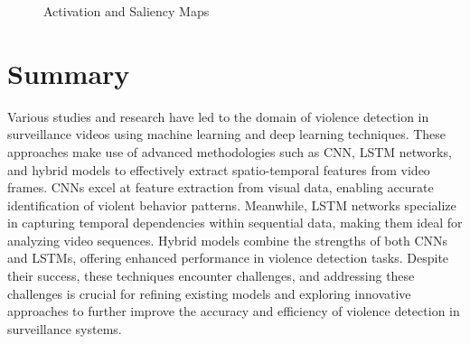\begin{figure}[h!]
\centering
{}
\hfill
{}
\caption{Activation and Saliency Maps}
    \label{LaM:2SRN}
\end{figure}


\section{Summary}

\noindent Various studies and research have led to the domain of violence detection in surveillance videos using machine learning and deep learning techniques. These approaches make use of advanced methodologies such as CNN, LSTM networks, and hybrid models to effectively extract spatio-temporal features from video frames. CNNs excel at feature extraction from visual data, enabling accurate identification of violent behavior patterns. Meanwhile, LSTM networks specialize in capturing temporal dependencies within sequential data, making them ideal for analyzing video sequences. Hybrid models combine the strengths of both CNNs and LSTMs, offering enhanced performance in violence detection tasks. Despite their success, these techniques encounter challenges, and addressing these challenges is crucial for refining existing models and exploring innovative approaches to further improve the accuracy and efficiency of violence detection in surveillance systems.

\clearpage

